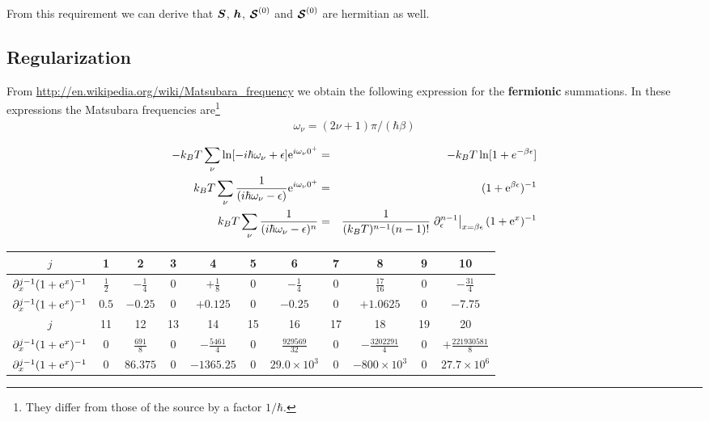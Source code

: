 \documentclass[11pt,a4paper]{report}
\begin{document}
From this requirement we can derive that $\bm{S}$, $\bm{h}$,
$\bm{\mathcal{S}}^{(0)}$ and $\bm{\mathcal{S}}^{(0)}$ are hermitian as well.

\subsection{Regularization}
From \url{http://en.wikipedia.org/wiki/Matsubara_frequency} we obtain
the following expression for the \textbf{fermionic} summations.  In
these expressions the Matsubara frequencies are\footnote{They differ
  from those of the source by a factor $1/\hbar$.}
\begin{eqnarray}
\omega_\nu=(2\nu+1)\pi/(\hbar\beta)
\end{eqnarray}


\begin{eqnarray}
-k_BT\sum_\nu\ln[-i\hbar\omega_\nu+\epsilon]\mathrm{e}^{i\omega_\nu0^+}
&=&-k_BT\ln[1+e^{-\beta \epsilon}]
\\
k_BT\sum_\nu \frac{1}{(i\hbar\omega_\nu-\epsilon)}\mathrm{e}^{i\omega_\nu 0^+}
&=&(1+\mathrm{e}^{\beta \epsilon})^{-1}
\\
k_BT\sum_\nu \frac{1}{(i\hbar\omega_\nu-\epsilon)^n}
&=&\frac{1}{(k_BT)^{n-1}(n-1)!}
\left.\partial_\epsilon^{n-1}\right|_{x=\beta\epsilon}(1+\mathrm{e}^{x})^{-1}
\end{eqnarray}
\begin{center}
\begin{tabular}{|c|c|c|c|c|c|c|c|c|c|c|}
\hline
$j$& 1 & 2 & 3 & 4 & 5 &6 &7 &8 & 9 & 10\\
\hline
$\partial^{j-1}_x(1+\mathrm{e}^{x})^{-1}$
&$\frac{1}{2}$ 
&$-\frac{1}{4}$ 
&$0$ 
&$+\frac{1}{8}$ 
&$0$ 
&$-\frac{1}{4}$ 
&$0$ 
&$\frac{17}{16}$
&$0$ 
&$-\frac{31}{4}$
\\
\hline
$\partial^{j-1}_x(1+\mathrm{e}^{x})^{-1}$
&$0.5$ 
&$-0.25$ 
&$0$ 
&$+0.125$ 
&$0$ 
&$-0.25$ 
&$0$ 
&$+1.0625$
&$0$ 
&$-7.75$
\\
\hline
\hline
$j$& 11 & 12 & 13 & 14 & 15 &16 &17 &18 & 19 & 20\\
\hline
$\partial^{j-1}_x(1+\mathrm{e}^{x})^{-1}$
&$0$ 
&$\frac{691}{8}$ 
&$0$ 
&$-\frac{5461}{4}$ 
&$0$ 
&$\frac{929569}{32}$ 
&$0$ 
&$-\frac{3202291}{4}$
&$0$ 
&$+\frac{221930581}{8}$
\\
\hline
$\partial^{j-1}_x(1+\mathrm{e}^{x})^{-1}$
&$0$ 
&$86.375$ 
&$0$ 
&$-1365.25$ 
&$0$ 
&$29.0\times10^3$ 
&$0$ 
&$-800\times10^3$
&$0$ 
&$27.7\times 10^6$ %
\\
\hline
\end{tabular}
\end{center}
\end{document}
